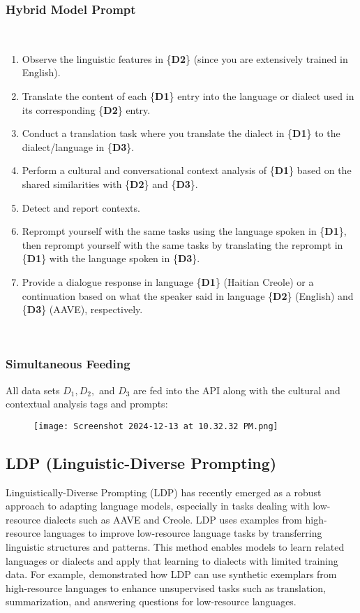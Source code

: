 \subsubsection{Hybrid Model Prompt}\\
\begin{enumerate}
    \item Observe the linguistic features in \{\textbf{D2}\} (since you are extensively trained in English).
    \item Translate the content of each \{\textbf{D1}\} entry into the language or dialect used in its corresponding \{\textbf{D2}\} entry.
    \item Conduct a translation task where you translate the dialect in \{\textbf{D1}\} to the dialect/language in \{\textbf{D3}\}.
    \item Perform a cultural and conversational context analysis of \{\textbf{D1}\} based on the shared similarities with \{\textbf{D2}\} and \{\textbf{D3}\}.
    \item Detect and report contexts.
    \item Reprompt yourself with the same tasks using the language spoken in \{\textbf{D1}\}, then reprompt yourself with the same tasks by translating the reprompt in \{\textbf{D1}\} with the language spoken in \{\textbf{D3}\}.
    \item Provide a dialogue response in language \{\textbf{D1}\} (Haitian Creole) or a continuation based on what the speaker said in language \{\textbf{D2}\} (English) and \{\textbf{D3}\} (AAVE), respectively.
\end{enumerate}\\

\subsubsection{Simultaneous Feeding}

All data sets \(D_1, D_2,\) and \(D_3\) are fed into the API along with the cultural and contextual analysis tags and prompts:

\begin{figure}[H]
    \centering
    \texttt{[image: Screenshot 2024-12-13 at 10.32.32 PM.png]}
    \label{fig:enter-label}
\end{figure}


\subsection{LDP (Linguistic-Diverse Prompting)}
Linguistically-Diverse Prompting (LDP) has recently emerged as a robust approach to adapting language models, especially in tasks dealing with low-resource dialects such as AAVE and Creole. LDP uses examples from high-resource languages to improve low-resource language tasks by transferring linguistic structures and patterns. This method enables models to learn related languages or dialects and apply that learning to dialects with limited training data. For example, \cite{Nguyen:24} demonstrated how LDP can use synthetic exemplars from high-resource languages to enhance unsupervised tasks such as translation, summarization, and answering questions for low-resource languages.

